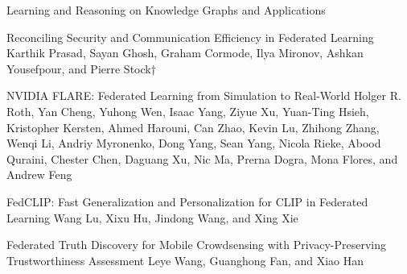 \documentclass[11pt]{article}
\begin{document}
\begin{bulletin}
\begin{articlesection}{Learning and Reasoning on Knowledge Graphs and Applications}

% 


\begin{article}
{Reconciling Security and Communication Efficiency in Federated Learning}
{Karthik Prasad, Sayan Ghosh, Graham Cormode, Ilya Mironov, Ashkan Yousefpour, and Pierre Stock†}

\end{article}

\begin{article}
{NVIDIA FLARE: Federated Learning from Simulation to Real-World}
{Holger R. Roth,
Yan Cheng,
Yuhong Wen,
Isaac Yang,
Ziyue Xu,
Yuan-Ting Hsieh,
Kristopher Kersten,
Ahmed Harouni,
Can Zhao,
Kevin Lu,
Zhihong Zhang,
Wenqi Li,
Andriy Myronenko,
Dong Yang,
Sean Yang,
Nicola Rieke,
Abood Quraini,
Chester Chen,
Daguang Xu,
Nic Ma,
Prerna Dogra,
Mona Flores, and
Andrew Feng}

\end{article}


\begin{article}
{FedCLIP: Fast Generalization and Personalization for CLIP in Federated Learning}
{Wang Lu, Xixu Hu, Jindong Wang, and Xing Xie}

\end{article}


\begin{article}
{Federated Truth Discovery for Mobile Crowdsensing with Privacy-Preserving Trustworthiness Assessment}
{Leye Wang, Guanghong Fan, and Xiao Han}

\end{article}


\end{articlesection}
\end{bulletin}
\end{document}
